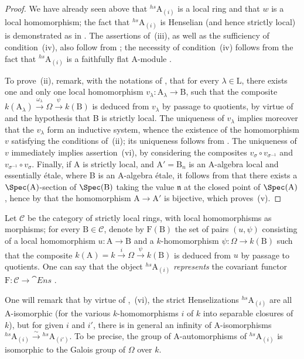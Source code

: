 \begin{proof}
We have already seen above that ${}^{hs}\!\mathrm{A}_{(i)}$ is a local ring and that $w$ is a local homomorphism;
the fact that ${}^{hs}\!\mathrm{A}_{(i)}$ is Henselian (and hence strictly local) is demonstrated as in .
The assertions of~(iii), as well as the sufficiency of condition~(iv), also follow from ; the necessity of condition~(iv) follows from the fact that ${}^{hs}\!\mathrm{A}_{(i)}$ is a faithfully flat A-module .

To prove~(ii), remark, with the notations of , that for every $\lambda\in\mathrm{L}$, there exists one and only one local homomorphism $v_\lambda:\mathrm{A}_\lambda\to\mathrm{B}$, such that the composite $k(\mathrm{A}_\lambda)\xrightarrow{\omega_\lambda}\Omega\xrightarrow{\psi}k(\mathrm{B})$ is deduced from $v_\lambda$ by passage to quotients, by virtue of  and the hypothesis that B is strictly local.
The uniqueness of $v_\lambda$ implies moreover that the $v_\lambda$ form an inductive system, whence the existence of the homomorphism $v$ satisfying the conditions of~(ii); its uniqueness follows from .
The uniqueness of $v$ immediately implies assertion~(vi), by considering the composites $v_\sigma\circ v_{\sigma^{-1}}$ and $v_{\sigma^{-1}}\circ v_\sigma$.
Finally, if A is strictly local, and $\mathrm{A}'=\mathrm{B}_n$ is an A-algebra local and essentially \'{e}tale, where B is an A-algebra \'{e}tale, it follows from  that there exists a $\Spec(\mathrm{A})$-section of $\Spec(\mathrm{B})$ taking the value $\mathfrak{n}$ at the closed point of $\Spec(\mathrm{A})$, hence by  that the homomorphism $\mathrm{A}\to\mathrm{A}'$ is bijective, which proves~(v).
\end{proof}

\begin{env}[18.8.8.1]
\label{IV.18.8.8.1}
Let $\mathcal{C}$ be the category of strictly local rings, with local homomorphisms as morphisms;
for every $\mathrm{B}\in\mathcal{C}$, denote by $\mathrm{F}(\mathrm{B})$ the set of pairs $(u,\psi)$ consisting of a local homomorphism $u:\mathrm{A}\to\mathrm{B}$ and a $k$-homomorphism $\psi:\Omega\to k(\mathrm{B})$ such that the composite $k(\mathrm{A})=k\xrightarrow{i}\Omega\xrightarrow{\psi}k(\mathrm{B})$ is deduced from $u$ by passage to quotients.
One can say that the object ${}^{hs}\!\mathrm{A}_{(i)}$ \emph{represents} the covariant functor $\mathrm{F}:\mathcal{C}\to\cat{Ens}$ .

One will remark that by virtue of ,~(vi), the strict Henselizations ${}^{hs}\!\mathrm{A}_{(i)}$ are all A-isomorphic (for the various $k$-homomorphisms $i$ of $k$ into separable closures of $k$), but for given $i$ and $i'$, there is in general an infinity of A-isomorphisms ${}^{hs}\!\mathrm{A}_{(i)}\xrightarrow{\sim}{}^{hs}\!\mathrm{A}_{(i')}$.
To be precise, the group of A-automorphisms of ${}^{hs}\!\mathrm{A}_{(i)}$ is isomorphic to the Galois group of $\Omega$ over $k$.
\end{env}

